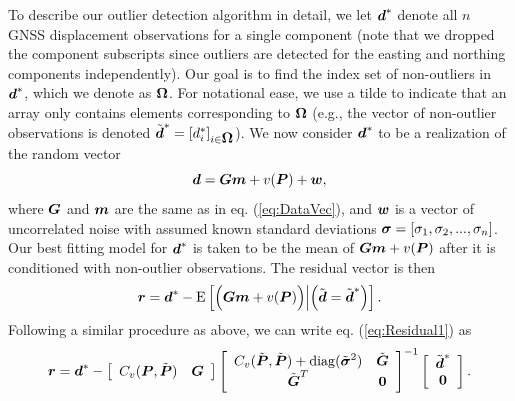 \documentclass[extra,mreferee]{gji}
\begin{document}
To describe our outlier detection algorithm in detail, we let $\mitbf{d}^*$ denote all $n$ GNSS displacement observations for a single component (note that we dropped the component subscripts since outliers are detected for the easting and northing components independently). Our goal is to find the index set of non-outliers in $\mitbf{d}^*$, which we denote as $\mitbf{\Omega}$. For notational ease, we use a tilde to indicate that an array only contains elements corresponding to $\mitbf{\Omega}$ (e.g., the vector of non-outlier observations is denoted $\tilde{\mitbf{d}}^* = [d_i^*]_{i \in \mitbf{\Omega}}$). We now consider $\mitbf{d}^*$ to be a realization of the random vector
\begin{equation}
\mitbf{d} = \mitbf{G}\mitbf{m} + v(\mitbf{P}) + \mitbf{w},
\end{equation}
where $\mitbf{G}$ and $\mitbf{m}$ are the same as in eq. (\ref{eq:DataVec}), and $\mitbf{w}$ is a vector of uncorrelated noise with assumed known standard deviations $\mitbf{\sigma} = [\sigma_1, \sigma_2, ..., \sigma_n]$. Our best fitting model for $\mitbf{d}^*$ is taken to be the mean of $\mitbf{G}\mitbf{m} + v(\mitbf{P})$ after it is conditioned with non-outlier observations. The residual vector is then
\begin{equation}\label{eq:Residual1}
\mitbf{r} = \mitbf{d}^* - \mathrm{E}\left[\Big(\mitbf{G}\mitbf{m} + v(\mitbf{P})\Big) \Big| \Big(\tilde{\mitbf{d}} = \tilde{\mitbf{d}}^*\Big)\right].
\end{equation}
Following a similar procedure as above, we can write eq. (\ref{eq:Residual1}) as
\begin{equation}\label{eq:Residual}
\mitbf{r} = \mitbf{d}^*  - 
            \left[\begin{array}{cc}
                  C_v(\mitbf{P},\tilde{\mitbf{P}}) & \mitbf{G} \\
                  \end{array}\right]
            \left[\begin{array}{cc}
                  C_v(\tilde{\mitbf{P}},\tilde{\mitbf{P}}) + \mathrm{diag}(\tilde{\mitbf{\sigma}}^2) & \tilde{\mitbf{G}} \\
                  \tilde{\mitbf{G}}^T  & \mitbf{0} \\
                  \end{array}\right]^{-1}
            \left[\begin{array}{c}
                  \tilde{\mitbf{d}}^* \\
                  \mitbf{0} \\
                  \end{array}\right].
\end{equation}
\end{document}
